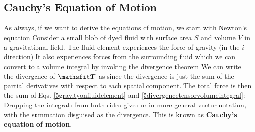 \documentclass[12pt]{book}
\begin{document}
\subsection{Cauchy's Equation of Motion}
As always, if we want to derive the equations of motion, we start with Newton's equation
Consider a small blob of dyed fluid with surface area $S$ and volume $V$ in a gravitational field.  The fluid element experiences the force of gravity (in the $i$-direction)
It also experiences forces from the surrounding fluid
which we can convert to a volume integral by invoking the divergence theorem
We can write the divergence of $\tensor T$ as 
since the divergence is just the sum of the partial derivatives with respect to each spatial component.  The total force is then the sum of Eqs. \ref{5gravityonfluidelement} and \ref{5divergencetensorvolumeintegral}:
Dropping the integrals from both sides gives
or
in more general vector notation, with the summation disguised as the divergence.  This is known as \textbf{Cauchy's equation of motion}.
\end{document}
